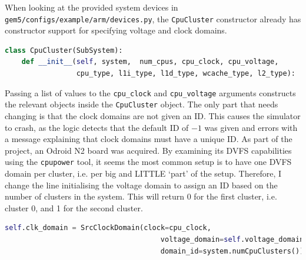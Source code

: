     When looking at the provided system devices in 
    \texttt{gem5/configs/example/arm/devices.py}, the \texttt{CpuCluster} 
    constructor already has constructor support for specifying voltage and 
    clock domains.
    \begin{lstlisting}[caption=The \texttt{CpuCluster} constructor, 
    language=Python, basicstyle=\sffamily\footnotesize]
class CpuCluster(SubSystem):
    def __init__(self, system,  num_cpus, cpu_clock, cpu_voltage,
                 cpu_type, l1i_type, l1d_type, wcache_type, l2_type):
    \end{lstlisting}
    Passing a list of values to the \texttt{cpu\_clock} and 
    \texttt{cpu\_voltage} arguments constructs the relevant objects inside the 
    \texttt{CpuCluster} object. The only part that needs changing is that the 
    clock domains are not given an ID. This causes the simulator to crash, as 
    the logic detects that the default ID of $-1$ was given and errors with a 
    message explaining that clock domains must have a unique ID. As part of the 
    project, an Odroid N2 board was acquired. By examining its DVFS capabilities
    using the \texttt{cpupower} tool, it seems the most common setup is to have
    one DVFS domain per cluster, i.e. per big and LITTLE `part' of the setup.
    Therefore, I change the line initialising the voltage domain to assign an ID
    based on the number of clusters in the system. This will return 0 for the 
    first cluster, i.e. cluster 0, and 1 for the second cluster.
    \begin{lstlisting}[caption=Modified line 126 of \texttt{devices.py}, 
    language=Python, basicstyle=\sffamily\footnotesize]
    self.clk_domain = SrcClockDomain(clock=cpu_clock,
                                     voltage_domain=self.voltage_domain,
                                     domain_id=system.numCpuClusters())
    \end{lstlisting}
    
